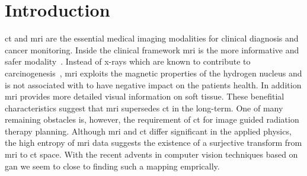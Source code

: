 \section{Introduction}

\gls{ct} and \gls{mri} are the essential medical imaging modalities for
clinical diagnosis and cancer monitoring. Inside the clinical framework
\gls{mri} is the more informative and safer modality~\cite{Hartwig09}. Instead
of x-rays which are known to contribute to carcinogenesis~\cite{Martin06},
\gls{mri} exploits the magnetic properties of the hydrogen nucleus and is not
associated with to have negative impact on the patients health. In addition
\gls{mri} provides more detailed visual information on soft tissue. These
benefitial characteristics suggest that \gls{mri} supersedes \gls{ct} in the
long-term. One of many remaining obstacles is, however, the requirement of
\gls{ct} for image guided radiation therapy planning. Although \gls{mri} and
\gls{ct} differ significant in the applied physics, the high entropy of
\gls{mri} data suggests the existence of a surjective transform from
\gls{mri} to \gls{ct} space. With the recent advents in computer vision
techniques based on \gls{gan} we seem to close to finding such a mapping
emprically.
